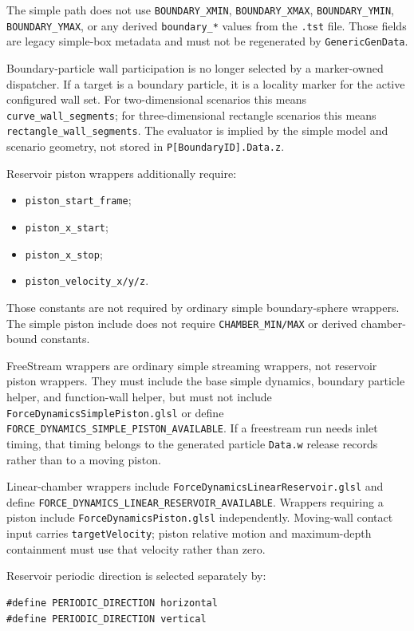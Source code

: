 The simple path does not use \texttt{BOUNDARY\_XMIN},
\texttt{BOUNDARY\_XMAX}, \texttt{BOUNDARY\_YMIN},
\texttt{BOUNDARY\_YMAX}, or any derived \texttt{boundary\_*} values from the
\texttt{.tst} file.  Those fields are legacy simple-box metadata and must not
be regenerated by \texttt{GenericGenData}.

Boundary-particle wall participation is no longer selected by a marker-owned
dispatcher.  If a target is a boundary particle, it is a locality marker for
the active configured wall set.  For two-dimensional scenarios this means
\texttt{curve\_wall\_segments}; for three-dimensional rectangle scenarios this
means \texttt{rectangle\_wall\_segments}.  The evaluator is implied by the
simple model and scenario geometry, not stored in
\texttt{P[BoundaryID].Data.z}.

Reservoir piston wrappers additionally require:
\begin{itemize}
    \item \texttt{piston\_start\_frame};
    \item \texttt{piston\_x\_start};
    \item \texttt{piston\_x\_stop};
    \item \texttt{piston\_velocity\_x/y/z}.
\end{itemize}
Those constants are not required by ordinary simple boundary-sphere wrappers.
The simple piston include does not require \texttt{CHAMBER\_MIN/MAX} or
derived chamber-bound constants.

FreeStream wrappers are ordinary simple streaming wrappers, not reservoir
piston wrappers.  They must include the base simple dynamics, boundary
particle helper, and function-wall helper, but must not include
\texttt{ForceDynamicsSimplePiston.glsl} or define
\texttt{FORCE\_DYNAMICS\_SIMPLE\_PISTON\_AVAILABLE}.  If a freestream run
needs inlet timing, that timing belongs to the generated particle
\texttt{Data.w} release records rather than to a moving piston.

Linear-chamber wrappers include
\texttt{ForceDynamicsLinearReservoir.glsl} and define
\texttt{FORCE\_DYNAMICS\_LINEAR\_RESERVOIR\_AVAILABLE}.  Wrappers requiring a
piston include \texttt{ForceDynamicsPiston.glsl} independently.  Moving-wall contact
input carries \texttt{targetVelocity}; piston relative motion and
maximum-depth containment must use that velocity rather than zero.

Reservoir periodic direction is selected separately by:
\begin{verbatim}
#define PERIODIC_DIRECTION horizontal
#define PERIODIC_DIRECTION vertical
\end{verbatim}

